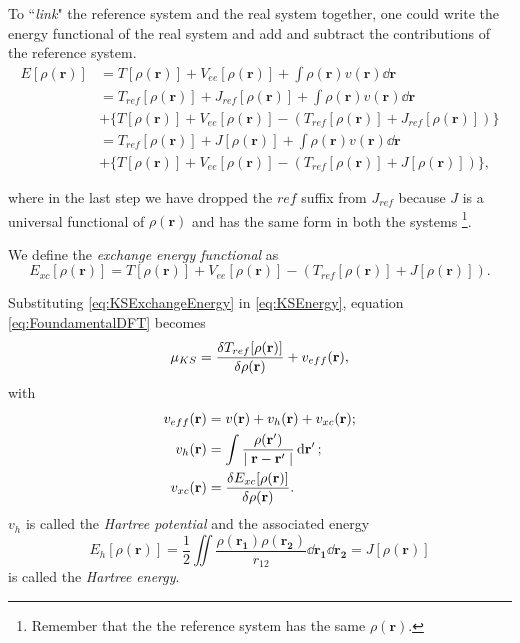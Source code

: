 \documentclass[a4paper,12pt]{article}
\newcommand\dens{\rho(\mathbf{r})}
\newcommand\erre{\mathbf{r}}
\begin{document}
To ``\textit{link}" the reference system and the real system together, one could write the energy functional of the real system and add and subtract the contributions of the reference system.
\begin{align}
	E[\dens] &= T[\dens] + V_{ee}[\dens] + \int \dens v(\erre) \dd{\erre} \\
			 &= T_{ref}[\dens] + J_{ref}[\dens] + \int \dens v(\erre) \dd{\erre} \nonumber \\ 
			 &+ \lbrace
			 	T[\dens] + V_{ee}[\dens] - 
			 	\left( 
			 		T_{ref}[\dens] + J_{ref}[\dens] 
			 	\right)
			 \rbrace \\
			 &= T_{ref}[\dens] + J[\dens] + \int \dens v(\erre) \dd{\erre} \nonumber \\ 
			 &+ \lbrace
			 	T[\dens] + V_{ee}[\dens] - 
			 	\left( 
			 		T_{ref}[\dens] + J[\dens] 
			 	\right)
			 \rbrace, \label{eq:KSEnergy}
\end{align}

where in the last step we have dropped the $ref$ suffix from $J_{ref}$ because $J$ is a universal functional of $\dens$ and has the same form in both the systems \footnote{Remember that the the reference system has the same $\dens$.}.

We define the \textit{exchange energy functional} as 
\begin{equation}\label{eq:KSExchangeEnergy}
E_{xc}[\dens] = T[\dens] + V_{ee}[\dens] - 
			 	\left( 
			 		T_{ref}[\dens] + J[\dens] 
			 	\right)
.
\end{equation}

Substituting \eqref{eq:KSExchangeEnergy} in \eqref{eq:KSEnergy}, equation \eqref{eq:FoundamentalDFT} becomes 
\begin{equation}\label{eq:KSChemPot} 
	\mu_{KS} = \frac{\var{T_{ref}[\dens]}}{\var{\dens}}  + v_{eff}(\erre),
\end{equation}
with 
\begin{align}
 v_{eff}(\erre) &= v(\erre)  + v_{h}(\erre)
 + v_{xc}(\erre) ;\\
 v_{h}(\erre) &= \int \frac{\rho(\mathbf{r'})}{\mid \mathbf{r} - \mathbf{r'} \mid}  \dd{\mathbf{r'}};\\
 v_{xc}(\erre) &= \frac{\var{E_{xc}[\dens]}}{\var{\dens}}.
\end{align}
$v_{h}$ is called the \textit{Hartree potential} and the associated energy 
\begin{equation}\label{eq:HartreeEnergy}
E_{h}[\dens] = \frac{1}{2} \iint \frac{\rho(\mathbf{r_{1}}) \rho(\mathbf{r_{2}}) }{r_{12}} \dd{\mathbf{r_1}} \dd{\mathbf{r_2}} = J[\dens]
\end{equation}
 is called the \textit{Hartree energy}.
\end{document}
